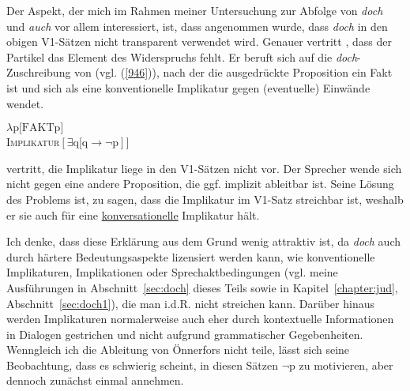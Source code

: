 {Der Aspekt, der mich im Rahmen meiner Untersuchung zur Abfolge von \textit{doch} und \textit{auch} vor allem interessiert, ist, dass angenommen wurde, dass \textit{doch} in den obigen V1-Sätzen nicht transparent verwendet wird. Genauer vertritt \citet[167]{Oennerfors1997}, dass der Partikel das Element des Widerspruchs fehlt. Er beruft sich auf die \textit{doch}-Zuschreibung von \citet{Ormelius-Sandblom1997} (vgl. (\ref{946})), nach der die ausgedrückte Proposition ein	Fakt ist und sich als eine konventionelle Implikatur  gegen (eventuelle) Einwände wendet.

\begin{exe}
	\ex\label{946} 
		$\lambda \textrm{p[FAKTp}]$\\
		\textsc{Implikatur}$[\exists \textrm{q[q} \rightarrow \neg \textrm{p}]]$
			\hfill\hbox {\citet[83]{Ormelius-Sandblom1997}}
\end{exe}
\citet[167]{Oennerfors1997} vertritt, die Implikatur liege in den V1-Sätzen nicht vor. Der Sprecher wende sich nicht gegen eine andere Proposition, die ggf. implizit ableitbar ist. Seine Lösung des Problems ist, zu sagen, dass die Implikatur im V1-Satz streichbar ist, weshalb er sie auch für eine \underline{konversationelle} Implikatur  hält.

Ich denke, dass diese Erklärung aus dem Grund wenig attraktiv ist, da \textit{doch} auch durch \glq härtere\grq {} Bedeutungsaspekte lizensiert werden kann, wie konventionelle Implikaturen, Implikationen  oder  Sprechaktbedingungen (vgl. meine Ausführungen in Abschnitt~\ref{sec:doch} dieses Teils sowie in Kapitel~\ref{chapter:jud}, Abschnitt~\ref{sec:doch1}), die man i.d.R. nicht streichen kann. Darüber hinaus werden Implikaturen normalerweise auch eher durch kontextuelle Informationen in Dialogen gestrichen und nicht aufgrund grammatischer Gegebenheiten. Wenngleich ich die Ableitung von Önnerfors nicht teile, lässt sich seine Beobachtung, dass es schwierig scheint, in diesen Sätzen $\neg$p zu motivieren, aber dennoch zunächst einmal annehmen. 

}
